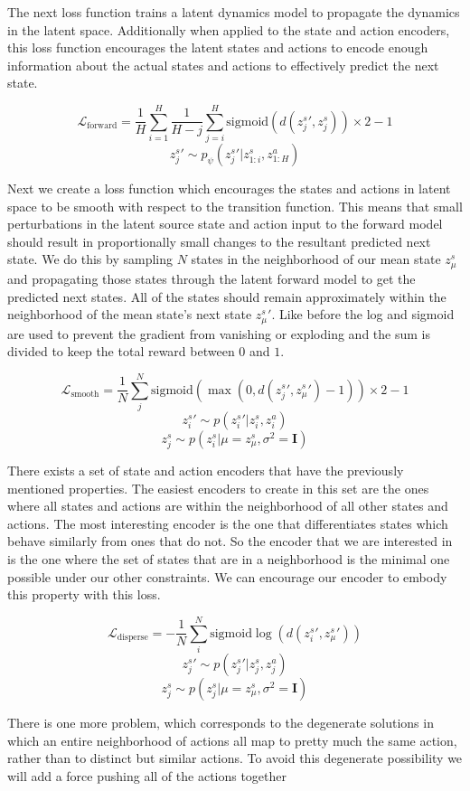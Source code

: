\documentclass{article}
\begin{document}
The next loss function trains a latent dynamics model to propagate the dynamics in the latent space.
Additionally when applied to the state and action encoders, this loss function encourages the latent states and actions to encode enough information about the actual states and actions to effectively predict the next state.

$$\mathcal{L}_{\text{forward}} = \frac{1}{H} \sum\limits_{i=1}^H \frac{1}{H-j} \sum\limits_{j=i}^H \text{sigmoid}(d({z^s_j}', z^s_j)) \times 2 - 1$$
$${z^s_j}' \sim p_\psi({z^s_j}' | z^s_{1:i},z^a_{1:H})$$


Next we create a loss function which encourages the states and actions in latent space to be smooth with respect to the transition function.
This means that small perturbations in the latent source state and action input to the forward model should result in proportionally small changes to the resultant predicted next state.
We do this by sampling $N$ states in the neighborhood of our mean state $z_\mu^s$ and propagating those states through the latent forward model to get the predicted next states.
All of the states should remain approximately within the neighborhood of the mean state's next state ${z_\mu^s}'$.
Like before the log and sigmoid are used to prevent the gradient from vanishing or exploding and the sum is divided to keep the total reward between $0$ and $1$.

$$\mathcal{L}_\text{smooth} = \frac{1}{N}\sum\limits_j^N \text{sigmoid}(\max(0, d({z^s_j}', {z^s_\mu}') - 1)) \times 2 - 1$$
$${z^s_i}' \sim p({z^s_i}'|z^s_i,z^a_i)$$
$$z^s_j \sim p(z^s_i | \mu=z^s_\mu, \sigma^2=\mathbf{I})$$


There exists a set of state and action encoders that have the previously mentioned properties.
The easiest encoders to create in this set are the ones where all states and actions are within the neighborhood of all other states and actions.
The most interesting encoder is the one that differentiates states which behave similarly from ones that do not.
So the encoder that we are interested in is the one where the set of states that are in a neighborhood is the minimal one possible under our other constraints.
We can encourage our encoder to embody this property with this loss.

$$\mathcal{L}_\text{disperse} = -\frac{1}{N}\sum\limits_i^N \text{sigmoid}\log(d({z^s_i}', {z^s_\mu}'))$$
$${z^s_j}' \sim p({z^s_j}'|z^s_j,z^a_j)$$
$$z^s_j \sim p(z^s_j | \mu=z^s_\mu, \sigma^2=\mathbf{I})$$


There is one more problem, which corresponds to the degenerate solutions in which an entire neighborhood of actions all map to pretty much the same action, rather than to distinct but similar actions.
To avoid this degenerate possibility we will add a force pushing all of the actions together
\end{document}

